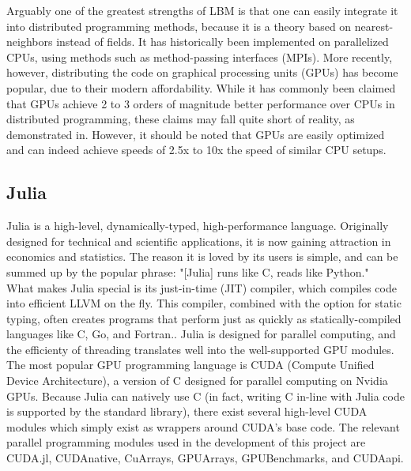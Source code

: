 \documentclass[twoside]{article}
\begin{document}
\noindent Arguably one of the greatest strengths of LBM is that one can easily integrate it into distributed programming methods, because it is a theory based on nearest-neighbors instead of fields. It has historically been implemented on parallelized CPUs, using methods such as method-passing interfaces (MPIs). More recently, however, distributing the code on graphical processing units (GPUs) has become popular, due to their modern affordability. While it has commonly been claimed that GPUs achieve  2 to 3 orders of magnitude better performance over CPUs in distributed programming, these claims may fall quite short of reality, as demonstrated in\cite{GPUvsCPU}. However, it should be noted that GPUs are easily optimized and can indeed achieve speeds of 2.5x to 10x the speed of similar CPU setups.

\subsection*{Julia}

Julia is a high-level, dynamically-typed, high-performance language\cite{JuliaLang}\cite{JuliaGithub}. Originally designed for technical and scientific applications, it is now gaining attraction in economics and statistics. The reason it is loved by its users is simple, and can be summed up by the popular phrase: "[Julia] runs like C, reads like Python."\cite{Perkel:2019}\\

\noindent What makes Julia special is its just-in-time (JIT) compiler, which compiles code into efficient LLVM on the fly. This compiler, combined with the option for static typing, often creates programs that perform just as quickly as statically-compiled languages like C, Go, and Fortran.\cite{JuliaBenchmarks}. Julia is designed for parallel computing, and the efficienty of threading translates well into the well-supported GPU modules.\\

\noindent The most popular GPU programming language is CUDA (Compute Unified Device Architecture), a version of C designed for parallel computing on Nvidia GPUs\cite{CUDAZone}. Because Julia can natively use C (in fact, writing C in-line with Julia code is supported by the standard library), there exist several high-level CUDA modules which simply exist as wrappers around CUDA's base code. The relevant parallel programming modules used in the development of this project are CUDA.jl\cite{CUDA_jl}, CUDAnative\cite{CUDAnative}, CuArrays\cite{CuArrays}, GPUArrays\cite{GPUArrays}, GPUBenchmarks\cite{GPUBenchmarks}, and CUDAapi\cite{CUDAapi}.\\
\end{document}

